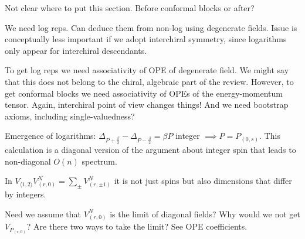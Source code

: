 \documentclass[12pt, a4paper]{article}
\theoremstyle{break}
\begin{document}
Not clear where to put this section. Before conformal blocks or after?

We need log reps. Can deduce them from non-log using degenerate fields. Issue is conceptually less important if we adopt interchiral symmetry, since logarithms only appear for interchiral descendants. 

To get log reps we need associativity of OPE of degenerate field. We might say that this does not belong to the chiral, algebraic part of the review. However, to get conformal blocks we need associativity of OPEs of the energy-momentum tensor. Again, interchiral point of view changes things! And we need bootstrap axioms, including single-valuedness? 

Emergence of logarithms: $\Delta_{P+\frac{\beta}{2}}-\Delta_{P-\frac{\beta}{2}} = \beta P$ integer $\implies P=P_{(0,s)}$. This calculation is a diagonal version of the argument about integer spin that leads to non-diagonal $O(n)$ spectrum.

In $V_{\langle 1,2\rangle}V^N_{(r,0)} = \sum_\pm V^N_{(r,\pm 1)}$ it is not just spins but also dimensions that differ by integers. 

Need we assume that $V^N_{(r,0)}$ is the limit of diagonal fields? Why would we not get $V_{P_{(r,0)}}$? Are there two ways to take the limit? See OPE coefficients. 




%
\end{document}
